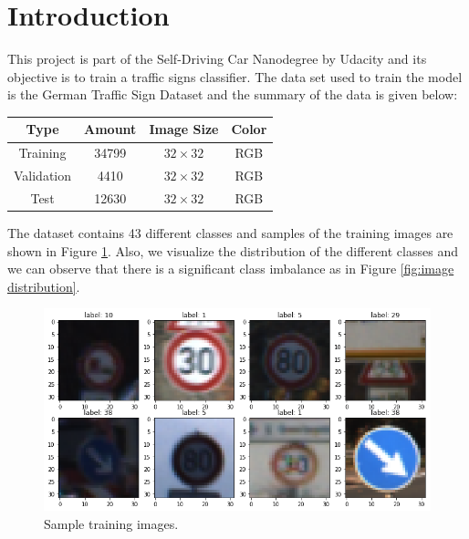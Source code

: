 \documentclass[12pt,twoside]{article}
\begin{document}



\section{Introduction}
This project is part of the Self-Driving Car Nanodegree by Udacity and its objective is to train a traffic signs classifier. The data set used to train the model is the  German Traffic Sign Dataset and the summary of the data is given below:

\begin{center}
\begin{tabular}{|c|c|c|c|}
\hline
\textbf{Type}	& \textbf{Amount}		& \textbf{Image Size}			& \textbf{Color}\\\hline
Training			& 34799					&			$32\times32$			& RGB\\
Validation			& 4410						&			$32\times32$			& RGB\\
Test					& 12630 					&			$32\times32$			& RGB\\\hline
\end{tabular}
\end{center}

The dataset contains 43 different classes and samples of the training images are shown in Figure \ref{fig:sample}. Also, we visualize the distribution of the different classes and we can observe that there is a significant class imbalance as in Figure \ref{fig:image distribution}.

\begin{figure}[H]
	\begin{center}
		\includegraphics[width = 1.0\hsize]{./figures/Training_data.png} 
		\caption{Sample training images.} %
		\label{fig:sample} %
	\end{center}
\end{figure}
\end{document}
